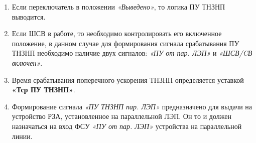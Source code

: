 \begin{enumerate}[label=\arabic{section}.\arabic{subsection}.\arabic{enumi}, labelsep=4pt, leftmargin=0pt, itemindent=57pt, itemsep=0pt, parsep=5pt]
\begin{enumerate}[label=\arabic{section}.\arabic{subsection}.\arabic{enumi}.\arabic*, labelsep=4pt, leftmargin=0em, itemindent=65pt, parsep=0pt]
\item
Если переключатель в положении \textit{«Выведено»}, то логика ПУ ТНЗНП выводится.
\item
Если ШСВ в работе, то необходимо контролировать его включенное положение, в данном случае для 
формирования сигнала срабатывания ПУ ТНЗНП необходимо наличие двух сигналов: \textit{«ПУ от пар. ЛЭП»} и 
\textit{«ШСВ/CВ включен»}.

\item
Время срабатывания поперечного ускорения ТНЗНП определяется уставкой \textbf{«Тср ПУ ТНЗНП»}.

\item
Формирование сигнала \textit{«ПУ ТНЗНП пар. ЛЭП»} предназначено для выдачи на устройство РЗА, установленное на параллельной ЛЭП. Он то и должен назначаться на вход ФСУ \textit{«ПУ от пар. ЛЭП»} устройства на параллельной линии. 

\end{enumerate}

\end{enumerate}